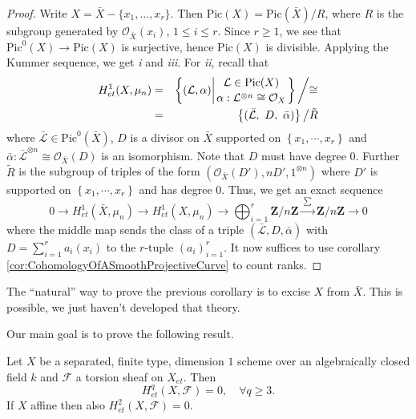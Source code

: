 \begin{proof}
Write $X = \bar X - \{ x_1, \dots, x_r\}$. Then $\text{Pic}(X) = \text{Pic}(\bar X)/ R$, where $R$ is the subgroup generated by $\mathcal{O}_{\bar X}(x_i)$, $1 \leq i \leq r$. Since $r \geq 1$, we see that $\text{Pic}^0(X) \to \text{Pic}(X)$ is surjective, hence $\text{Pic}(X)$ is divisible. Applying the Kummer sequence, we get {\it i} and {\it iii}. For {\it ii}, recall that
\begin{eqnarray*}
H_{et}^1(X, \mu_n) & = &
\left\{
{(\mathcal L, \alpha) {\bigg |} {{\mathcal L \in \text{Pic}(X) }
\atop 
{\alpha: \mathcal L^{\otimes n} \cong \mathcal{O}_X}}}
\right\}
{\bigg /} {\cong} \\
& = & 
\left\{(\bar{\mathcal L}, \ D, \ \bar \alpha) \right\} {\big /} \tilde{R}
\end{eqnarray*}
where $\bar{\mathcal L} \in \text{Pic}^0(\bar X)$, $D$ is a divisor on $\bar X$ supported on $\left\{x_1, \cdots, x_r\right\}$ and $ \bar{\alpha}: \bar{\mathcal L}^{\otimes n} \cong \mathcal{O}_{\bar{X}}(D)$ is an isomorphism. Note that $D$ must have degree 0. Further $\tilde{R}$ is the subgroup of triples of the form $(\mathcal{O}_{\bar X}(D'), n D', 1^{\otimes n})$ where $D'$ is supported on $\left\{x_1, \cdots, x_r\right\}$ and has degree 0. Thus, we get an exact sequence
$$
0 \longrightarrow
H_{et}^1(\bar X, \mu_n) \longrightarrow
H_{et}^1(X, \mu_n)  \longrightarrow
\bigoplus_{i=1}^r \mathbf{Z}/n\mathbf{Z} 
\xrightarrow{\ \sum\ }
\mathbf{Z}/n\mathbf{Z} \longrightarrow 0
$$
where the middle map sends the class of a triple $(\bar{ \mathcal L}, D, \bar \alpha)$ with $D = \sum_{i=1}^r a_i (x_i)$ to the $r$-tuple $(a_i)_{i=1}^r$. It now suffices to use corollary \ref{cor:CohomologyOfASmoothProjectiveCurve} to count ranks.
\end{proof}

\begin{remark}
The ``natural'' way to prove the previous corollary is to excise $X$ from $\bar X$. This is possible, we just haven't developed that theory.
\end{remark}

Our main goal is to prove the following result.

\begin{theorem} \label{thm:vanishingForCurves}
Let $X$ be a separated, finite type, dimension $1$ scheme over an algebraically closed field $k$ and  $\mathcal{F}$ a torsion sheaf on $X_{et}$. Then 
$$
H_{et}^q(X, \mathcal{F}) = 0, \quad \forall q\geq 3.
$$ 
If $X$ affine then also $H_{et}^2(X, \mathcal{F}) = 0$. 
\end{theorem}	

